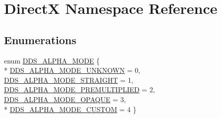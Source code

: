 \hypertarget{namespace_direct_x}{}\section{DirectX Namespace Reference}
\label{namespace_direct_x}
\subsection*{Enumerations}
\begin{DoxyCompactItemize}
\item 
enum \hyperlink{namespace_direct_x_a7cb48689d75471680c0bf7f79caaaf1f_a7cb48689d75471680c0bf7f79caaaf1f}{D\+D\+S\+\_\+\+A\+L\+P\+H\+A\+\_\+\+M\+O\+DE} \{ \\*
\hyperlink{namespace_direct_x_a7cb48689d75471680c0bf7f79caaaf1f_a7cb48689d75471680c0bf7f79caaaf1fa9cfa0bbf0542b2d5da9da93e629f50ce}{D\+D\+S\+\_\+\+A\+L\+P\+H\+A\+\_\+\+M\+O\+D\+E\+\_\+\+U\+N\+K\+N\+O\+WN} = 0, 
\hyperlink{namespace_direct_x_a7cb48689d75471680c0bf7f79caaaf1f_a7cb48689d75471680c0bf7f79caaaf1fa3c462f8d7aff2a2590d933fb1dfd6136}{D\+D\+S\+\_\+\+A\+L\+P\+H\+A\+\_\+\+M\+O\+D\+E\+\_\+\+S\+T\+R\+A\+I\+G\+HT} = 1, 
\hyperlink{namespace_direct_x_a7cb48689d75471680c0bf7f79caaaf1f_a7cb48689d75471680c0bf7f79caaaf1facdd00e8572344a8e6d3c4254607d7be8}{D\+D\+S\+\_\+\+A\+L\+P\+H\+A\+\_\+\+M\+O\+D\+E\+\_\+\+P\+R\+E\+M\+U\+L\+T\+I\+P\+L\+I\+ED} = 2, 
\hyperlink{namespace_direct_x_a7cb48689d75471680c0bf7f79caaaf1f_a7cb48689d75471680c0bf7f79caaaf1fa8de87a525290e381f32102aa6a5be7c3}{D\+D\+S\+\_\+\+A\+L\+P\+H\+A\+\_\+\+M\+O\+D\+E\+\_\+\+O\+P\+A\+Q\+UE} = 3, 
\\*
\hyperlink{namespace_direct_x_a7cb48689d75471680c0bf7f79caaaf1f_a7cb48689d75471680c0bf7f79caaaf1fab78d94eee31a6d8a3b97427e0dddb55e}{D\+D\+S\+\_\+\+A\+L\+P\+H\+A\+\_\+\+M\+O\+D\+E\+\_\+\+C\+U\+S\+T\+OM} = 4
 \}
\end{DoxyCompactItemize}
